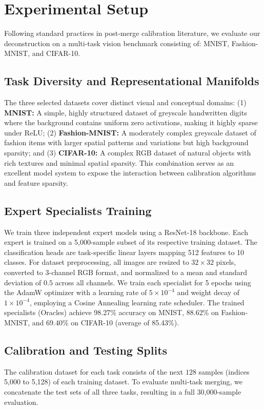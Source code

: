 \documentclass{article}
\theoremstyle{plain}
\theoremstyle{definition}
\theoremstyle{remark}
\begin{document}
\section{Experimental Setup}
\label{sec:setup}
Following standard practices in post-merge calibration literature, we evaluate our deconstruction on a multi-task vision benchmark consisting of: MNIST, Fashion-MNIST, and CIFAR-10. 

\subsection{Task Diversity and Representational Manifolds}
The three selected datasets cover distinct visual and conceptual domains: (1) \textbf{MNIST:} A simple, highly structured dataset of greyscale handwritten digits where the background contains uniform zero activations, making it highly sparse under ReLU; (2) \textbf{Fashion-MNIST:} A moderately complex greyscale dataset of fashion items with larger spatial patterns and variations but high background sparsity; and (3) \textbf{CIFAR-10:} A complex RGB dataset of natural objects with rich textures and minimal spatial sparsity. This combination serves as an excellent model system to expose the interaction between calibration algorithms and feature sparsity.

\subsection{Expert Specialists Training}
We train three independent expert models using a ResNet-18 backbone. Each expert is trained on a 5,000-sample subset of its respective training dataset. The classification heads are task-specific linear layers mapping 512 features to 10 classes. For dataset preprocessing, all images are resized to $32 \times 32$ pixels, converted to 3-channel RGB format, and normalized to a mean and standard deviation of $0.5$ across all channels. We train each specialist for 5 epochs using the AdamW optimizer with a learning rate of $5 \times 10^{-4}$ and weight decay of $1 \times 10^{-4}$, employing a Cosine Annealing learning rate scheduler. The trained specialists (Oracles) achieve 98.27\% accuracy on MNIST, 88.62\% on Fashion-MNIST, and 69.40\% on CIFAR-10 (average of 85.43\%).

\subsection{Calibration and Testing Splits}
The calibration dataset for each task consists of the next $128$ samples (indices 5,000 to 5,128) of each training dataset. To evaluate multi-task merging, we concatenate the test sets of all three tasks, resulting in a full 30,000-sample evaluation.
\end{document}
